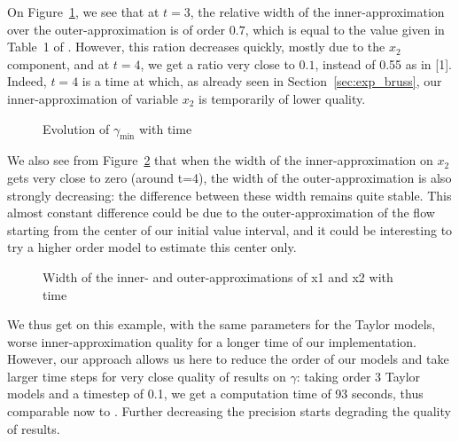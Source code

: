 

On Figure~\ref{ex:width_sriram_bruss}, we see that at $t=3$, the relative width of the inner-approximation over the
outer-approximation is of order $0.7$, which is equal to the value given in Table~1 of \cite{Underapproxflowpipes}. 
However, this ration decreases quickly, mostly due to the $x_2$ component, and at $t=4$, we get a ratio very close to $0.1$,
instead of 0.55 as in [1]. Indeed, $t=4$ is a time at which, as already seen in Section~\ref{sec:exp_bruss}, our 
inner-approximation of variable $x_2$ is temporarily of lower quality.
\begin{figure}
\begin{center}
\end{center}
\caption{Evolution of $\gamma_{\min}$ with time}
\label{ex:width_sriram_bruss}
\end{figure}
We also see from Figure~\ref{ex:width_sriram_bruss_x1x2} that when the width of the inner-approximation on $x_2$ gets very close 
to zero (around t=4), the width of the outer-approximation is also strongly decreasing: the difference between these width remains 
quite stable. This almost constant difference could be due to the outer-approximation of the flow starting from the center of our 
initial value interval, and it could be interesting to try a higher order model to estimate this center only.
\begin{figure}[htbp]
\caption{Width of the inner- and outer-approximations of x1 and x2 with time}
\label{ex:width_sriram_bruss_x1x2}
\end{figure}
We thus get on this example, with the same parameters for the Taylor models, worse inner-approximation quality for a longer time of our implementation. 
However, our approach allows us here to reduce the order of our models and take larger time steps for very close quality of results on $\gamma$: taking order 3 
Taylor models and a timestep of 0.1, we get a computation time of 93 seconds, thus comparable now to \cite{Underapproxflowpipes}. 
Further decreasing the precision starts degrading the quality of results.    

